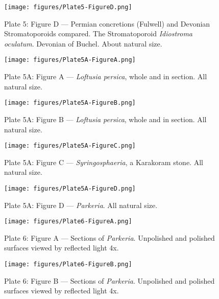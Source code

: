 \documentclass[a4paper, 12pt, oneside]{article}
\begin{document}
\clearpage
\begin{figure}[b]
\centering
\texttt{[image: figures/Plate5-FigureD.png]}
\caption{\small Plate 5: Figure D --- Permian concretions (Fulwell) and Devonian Stromatoporoids compared. The Stromatoporoid \emph{Idiostroma oculatum}. Devonian of Buchel. About natural size.}
\end{figure}
\clearpage
{}
\cfoot{\thepage}
\begin{figure}[b]
\centering
\texttt{[image: figures/Plate5A-FigureA.png]}
\caption{\small Plate 5A: Figure A --- \emph{Loftusia persica}, whole and in section. All natural size.}
\end{figure}
\clearpage
\begin{figure}[b]
\centering
\texttt{[image: figures/Plate5A-FigureB.png]}
\caption{\small Plate 5A: Figure B --- \emph{Loftusia persica}, whole and in section. All natural size.}
\end{figure}
\clearpage
\begin{figure}[b]
\centering
\texttt{[image: figures/Plate5A-FigureC.png]}
\caption{\small Plate 5A: Figure C --- \emph{Syringosphaeria}, a Karakoram stone. All natural size.}
\end{figure}
\clearpage
\begin{figure}[b]
\centering
\texttt{[image: figures/Plate5A-FigureD.png]}
\caption{\small Plate 5A: Figure D --- \emph{Parkeria}. All natural size.}
\end{figure}
\clearpage
{}
\cfoot{\thepage}
\begin{figure}[b]
\centering
\texttt{[image: figures/Plate6-FigureA.png]}
\caption{\small Plate 6: Figure A --- Sections of \emph{Parkeria}. Unpolished and polished surfaces viewed by reflected light 4x.}
\end{figure}
\clearpage
\begin{figure}[b]
\centering
\texttt{[image: figures/Plate6-FigureB.png]}
\caption{\small Plate 6: Figure B --- Sections of \emph{Parkeria}. Unpolished and polished surfaces viewed by reflected light 4x.}
\end{figure}
\end{document}

